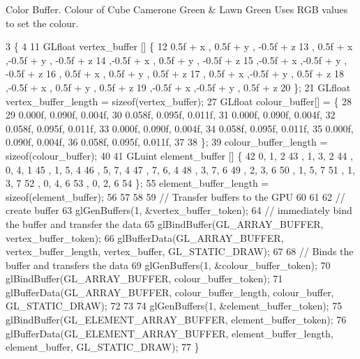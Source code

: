 Color Buffer. Colour of Cube Camerone Green \& Lawn Green Uses R\+G\+B values to set the colour.
\begin{DoxyCode}
3                                                         \{
4 
11   GLfloat vertex\_buffer [] \{
12       0.5f + x  , 0.5f + y  , -0.5f + z
13     , 0.5f + x  ,-0.5f + y  , -0.5f + z
14     ,-0.5f + x  , 0.5f + y  , -0.5f + z
15     ,-0.5f + x  ,-0.5f + y  , -0.5f + z
16     , 0.5f + x  , 0.5f + y  ,  0.5f + z
17     , 0.5f + x  ,-0.5f + y  ,  0.5f + z
18     ,-0.5f + x  , 0.5f + y  ,  0.5f + z
19     ,-0.5f + x  ,-0.5f + y  ,  0.5f + z
20   \};
21   GLfloat vertex\_buffer\_length = \textcolor{keyword}{sizeof}(vertex\_buffer);
27   GLfloat colour\_buffer[] = \{
28 
29      0.000f, 0.090f, 0.004f, 
30      0.058f, 0.095f, 0.011f,
31      0.000f, 0.090f, 0.004f,
32      0.058f, 0.095f, 0.011f,
33      0.000f, 0.090f, 0.004f,
34      0.058f, 0.095f, 0.011f,
35      0.000f, 0.090f, 0.004f,
36      0.058f, 0.095f, 0.011f,
37 
38   \};
39  colour\_buffer\_length = \textcolor{keyword}{sizeof}(colour\_buffer);
40   
41   GLuint element\_buffer []  \{
42       0, 1, 2   
43     , 1, 3, 2
44     , 0, 4, 1   
45     , 1, 5, 4   
46     , 5, 7, 4   
47     , 7, 6, 4   
48     , 3, 7, 6   
49     , 2, 3, 6   
50     , 1, 5, 7   
51     , 1, 3, 7   
52     , 0, 4, 6   
53     , 0, 2, 6   
54   \};
55   element\_buffer\_length = \textcolor{keyword}{sizeof}(element\_buffer);
56 
57 
58 
59   \textcolor{comment}{// Transfer buffers to the GPU}
60 
61 
62   \textcolor{comment}{// create buffer}
63   glGenBuffers(1, &vertex\_buffer\_token);
64   \textcolor{comment}{// immediately bind the buffer and transfer the data}
65   glBindBuffer(GL\_ARRAY\_BUFFER, vertex\_buffer\_token);
66   glBufferData(GL\_ARRAY\_BUFFER, vertex\_buffer\_length, vertex\_buffer, GL\_STATIC\_DRAW);
67 
68   \textcolor{comment}{// Binds the buffer and transfers the data}
69   glGenBuffers(1, &colour\_buffer\_token);
70   glBindBuffer(GL\_ARRAY\_BUFFER, colour\_buffer\_token);
71   glBufferData(GL\_ARRAY\_BUFFER, colour\_buffer\_length, colour\_buffer, GL\_STATIC\_DRAW);
72 
73 
74   glGenBuffers(1, &element\_buffer\_token);
75   glBindBuffer(GL\_ELEMENT\_ARRAY\_BUFFER, element\_buffer\_token);
76   glBufferData(GL\_ELEMENT\_ARRAY\_BUFFER, element\_buffer\_length, element\_buffer, GL\_STATIC\_DRAW);
77 \}
\end{DoxyCode}
\hypertarget{classLeavesAsset_ae98d43a307f4c75cc8a661f0b36a213a}{}
